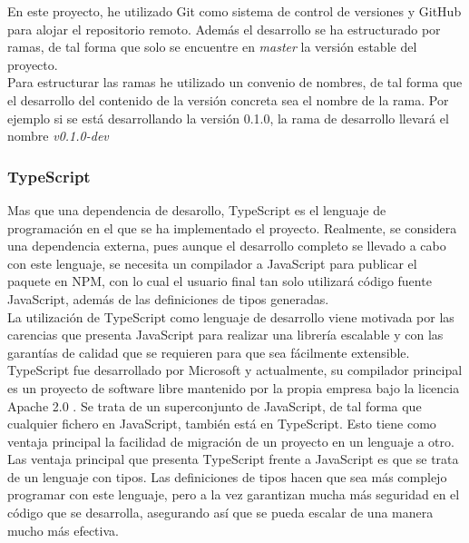 En este proyecto, he utilizado Git \cite{git} como sistema de control de versiones y GitHub \cite{github} para alojar el repositorio remoto. Además el desarrollo se ha estructurado por ramas, de tal forma que solo se encuentre en \textit{master} la versión estable del proyecto. \\

Para estructurar las ramas he utilizado un convenio de nombres, de tal forma que el desarrollo del contenido de la versión concreta sea el nombre de la rama. Por ejemplo si se está desarrollando la versión 0.1.0, la rama de desarrollo llevará el nombre \textit{v0.1.0-dev}

\subsubsection{TypeScript}
 
 Mas que una dependencia de desarollo, TypeScript es el lenguaje de programación en el que se ha implementado el proyecto. Realmente, se considera una dependencia externa, pues aunque el desarrollo completo se llevado a cabo con este lenguaje, se necesita un compilador a JavaScript para publicar el paquete en NPM, con lo cual el usuario final tan solo utilizará código fuente JavaScript, además de las definiciones de tipos generadas. \\
 
 La utilización de TypeScript como lenguaje de desarrollo viene motivada por las carencias que presenta JavaScript para realizar una librería escalable y con las garantías de calidad que se requieren para que sea fácilmente extensible. \\
 
 TypeScript fue desarrollado por Microsoft y actualmente, su compilador principal es un proyecto de software libre mantenido por la propia empresa bajo la licencia Apache 2.0 \cite{typescriptrepo}. Se trata de un superconjunto de JavaScript, de tal forma que cualquier fichero en JavaScript, también está en TypeScript. Esto tiene como ventaja principal la facilidad de migración de un proyecto en un lenguaje a otro. \\
 
 Las ventaja principal que presenta TypeScript frente a JavaScript es que se trata de un lenguaje con tipos. Las definiciones de tipos hacen que sea más complejo programar con este lenguaje, pero a la vez garantizan mucha más seguridad en el código que se desarrolla, asegurando así que se pueda escalar de una manera mucho más efectiva. \\
 
